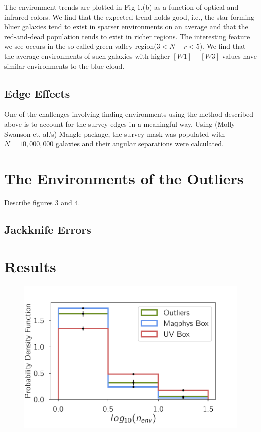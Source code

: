 \documentclass[iop]{emulateapj}
\begin{document}
The environment trends are plotted in Fig $1.$(b) as a function of optical and infrared colors. We find that the expected trend holds good, i.e., the star-forming bluer galaxies tend to exist in sparser environments on an average and that the red-and-dead population tends to exist in richer regions. The interesting feature we see occurs in the so-called green-valley region($3 <N-r < 5$). We find that the average environments of such galaxies with higher $[W1]-[W3]$ values have similar environments to the blue cloud.\\

\subsection{Edge Effects}
One of the challenges involving finding environments using the method described above is to account for the survey edges in a meaningful way. Using (Molly Swanson et. al.'s) Mangle package, the survey mask was populated with $N = 10,000,000$ galaxies and their angular separations were calculated.

\section{The Environments of the Outliers}
Describe figures $3$ and $4$.
\subsection{Jackknife Errors}



\vspace{100px}

\section{Results}
\begin{figure}
	\centering
		\includegraphics[width = 9 cm, height = 6.0 cm]{jk_plot.pdf}
	\caption{} 
\end{figure}
\end{document}
